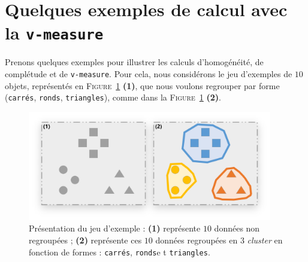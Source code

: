 	\newpage
	\section{Quelques exemples de calcul avec la \texttt{v-measure}}
	\label{annex:D.2-ANNEXE-EVALUATION-CLUSTERING-EXEMPLE-VMEASURE}
		
		Prenons quelques exemples pour illustrer les calculs d'homogénéité, de complétude et de \texttt{v-measure}.
		Pour cela, nous considérons le jeu d'exemples de $10$ objets, représentés en \textsc{Figure~\ref{figure:D.2-ANNEXE-EVALUATION-CLUSTERING-EXEMPLE-VMEASURE-0-PRESENTATION}} \textbf{(1)}, que nous voulons regrouper par forme (\texttt{carrés}, \texttt{ronds}, \texttt{triangles}), comme dans la \textsc{Figure~\ref{figure:D.2-ANNEXE-EVALUATION-CLUSTERING-EXEMPLE-VMEASURE-0-PRESENTATION}} \textbf{(2)}.
		\begin{figure}[H]
			\centering
			\includegraphics[width=0.95\textwidth]{figures/annexe-vmeasure-presentation}
			\caption{
				Présentation du jeu d'exemple :
				\textbf{(1)} représente $10$ données non regroupées ;
				\textbf{(2)} représente ces $10$ données regroupées en $3$ \textit{cluster} en fonction de formes : \texttt{carrés}, \texttt{ronds}e t \texttt{triangles}.
			}
			\label{figure:D.2-ANNEXE-EVALUATION-CLUSTERING-EXEMPLE-VMEASURE-0-PRESENTATION}
		\end{figure}
		
